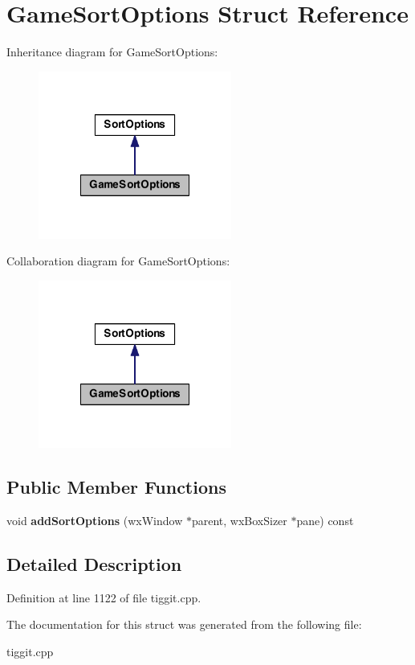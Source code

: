 \hypertarget{struct_game_sort_options}{\section{Game\-Sort\-Options Struct Reference}
\label{struct_game_sort_options}
}


Inheritance diagram for Game\-Sort\-Options\-:
\nopagebreak
\begin{figure}[H]
\begin{center}
\leavevmode
\includegraphics[width=180pt]{struct_game_sort_options__inherit__graph}
\end{center}
\end{figure}


Collaboration diagram for Game\-Sort\-Options\-:
\nopagebreak
\begin{figure}[H]
\begin{center}
\leavevmode
\includegraphics[width=180pt]{struct_game_sort_options__coll__graph}
\end{center}
\end{figure}
\subsection*{Public Member Functions}
\begin{DoxyCompactItemize}
\item 
\hypertarget{struct_game_sort_options_a07d340aa5c46550a502278036b9d23ca}{void {\bfseries add\-Sort\-Options} (wx\-Window $\ast$parent, wx\-Box\-Sizer $\ast$pane) const }\label{struct_game_sort_options_a07d340aa5c46550a502278036b9d23ca}

\end{DoxyCompactItemize}


\subsection{Detailed Description}


Definition at line 1122 of file tiggit.\-cpp.



The documentation for this struct was generated from the following file\-:\begin{DoxyCompactItemize}
\item 
tiggit.\-cpp\end{DoxyCompactItemize}
